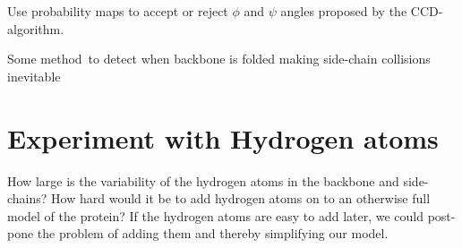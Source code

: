 Use probability maps to accept or reject $\phi$ and $\psi$ angles proposed by the CCD-algorithm.

Some method\texttrademark\ to detect when backbone is folded making side-chain collisions inevitable

\section{Experiment with Hydrogen atoms}
How large is the variability of the hydrogen atoms in the backbone and
side-chains? How hard would it be to add hydrogen atoms on to an
otherwise full model of the protein? If the hydrogen atoms are easy to
add later, we could post-pone the problem of adding them and thereby
simplifying our model.


